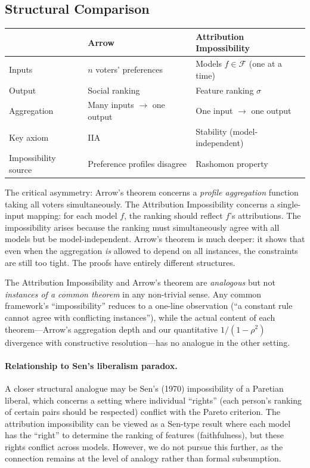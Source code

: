 \documentclass{article}
\begin{document}
\subsection{Structural Comparison}

\begin{center}
\small
\begin{tabular}{@{}lll@{}}
\toprule
& \textbf{Arrow} & \textbf{Attribution Impossibility} \\
\midrule
Inputs & $n$ voters' preferences & Models $f \in \mathcal{F}$ (one at a time) \\
Output & Social ranking & Feature ranking $\sigma$ \\
Aggregation & Many inputs $\to$ one output & One input $\to$ one output \\
Key axiom & IIA & Stability (model-independent) \\
Impossibility source & Preference profiles disagree & Rashomon property \\
\bottomrule
\end{tabular}
\end{center}

The critical asymmetry: Arrow's theorem concerns a \emph{profile aggregation} function taking all voters simultaneously. The Attribution Impossibility concerns a single-input mapping: for each model $f$, the ranking should reflect $f$'s attributions. The impossibility arises because the ranking must simultaneously agree with all models but be model-independent. Arrow's theorem is much deeper: it shows that even when the aggregation \emph{is} allowed to depend on all instances, the constraints are still too tight. The proofs have entirely different structures.

The Attribution Impossibility and Arrow's theorem are \emph{analogous} but not \emph{instances of a common theorem} in any non-trivial sense. Any common framework's ``impossibility'' reduces to a one-line observation (``a constant rule cannot agree with conflicting instances''), while the actual content of each theorem---Arrow's aggregation depth and our quantitative $1/(1-\rho^2)$ divergence with constructive resolution---has no analogue in the other setting.

\paragraph{Relationship to Sen's liberalism paradox.}
A closer structural analogue may be Sen's (1970) impossibility of a Paretian liberal, which concerns a setting where individual ``rights'' (each person's ranking of certain pairs should be respected) conflict with the Pareto criterion. The attribution impossibility can be viewed as a Sen-type result where each model has the ``right'' to determine the ranking of features (faithfulness), but these rights conflict across models. However, we do not pursue this further, as the connection remains at the level of analogy rather than formal subsumption.
\end{document}
